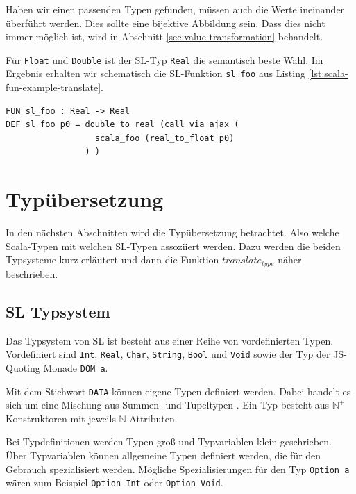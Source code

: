 \documentclass[12pt,bibtotoc]{scrreprt}
\begin{document}
Haben wir einen passenden Typen gefunden, müssen auch die Werte ineinander überführt werden. Dies sollte eine bijektive Abbildung sein. Dass dies nicht immer möglich ist, wird in Abschnitt \ref{sec:value-transformation} behandelt.

Für \lstinline!Float! und \lstinline!Double! ist der SL-Typ \lstinline!Real! die semantisch beste Wahl. Im Ergebnis erhalten wir schematisch die SL-Funktion \lstinline!sl_foo! aus Listing \ref{lst:scala-fun-example-translate}.

\begin{lstlisting}[caption=Übersetzung von scala\_foo, label=lst:scala-fun-example-translate]
FUN sl_foo : Real -> Real
DEF sl_foo p0 = double_to_real (call_via_ajax (
                  scala_foo (real_to_float p0) 
                ) )
\end{lstlisting}

\section{Typübersetzung}
\label{sec:type-translation}

In den nächsten Abschnitten wird die Typübersetzung betrachtet. Also welche Scala-Typen mit welchen SL-Typen assoziiert werden. Dazu werden die beiden Typsysteme kurz erläutert und dann die Funktion $translate_{type}$ näher beschrieben.

\subsection{SL Typsystem}
\label{subsec:sl-typesystem}

Das Typsystem von SL ist besteht aus einer Reihe von vordefinierten Typen. Vordefiniert sind \lstinline!Int!, \lstinline!Real!, \lstinline!Char!, \lstinline!String!, \lstinline!Bool! und \lstinline!Void! sowie der Typ der JS-Quoting Monade \lstinline!DOM a!.

Mit dem Stichwort \lstinline!DATA! können eigene Typen definiert werden. Dabei handelt es sich um eine Mischung aus Summen- und Tupeltypen \cite[S.119f u. S. 123]{Pepper2007}. Ein Typ besteht aus $\mathbb{N}^+$ Konstruktoren mit jeweils $\mathbb{N}$ Attributen.

Bei Typdefinitionen werden Typen groß und Typvariablen klein geschrieben. Über Typvariablen können allgemeine Typen definiert werden, die für den Gebrauch spezialisiert werden. Mögliche Spezialisierungen für den Typ \lstinline!Option a! wären zum Beispiel \lstinline!Option Int! oder \lstinline!Option Void!.
\end{document}
